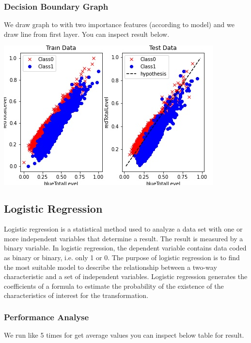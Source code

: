 \documentclass[a4paper]{article}
\begin{document}
\subsubsection{Decision Boundary Graph}

We draw graph to with two importance features (according to model) and we draw line from first layer. You can inspect result below.

\medskip

\includegraphics[width=.9\linewidth]{graphs/perceptron_decision_boundary.jpeg}


\pagebreak

\subsection{Logistic Regression}

Logistic regression is a statistical method used to analyze a data set with one or more independent variables that determine a result. The result is measured by a binary variable. In logistic regression, the dependent variable contains data coded as binary or binary, i.e. only 1 or 0. The purpose of logistic regression is to find the most suitable model to describe the relationship between a two-way characteristic and a set of independent variables. Logistic regression generates the coefficients of a formula to estimate the probability of the existence of the characteristics of interest for the transformation.

\subsubsection{Performance Analyse}

We run like 5 times  for get average values you can inspect below table for result.
\end{document}
